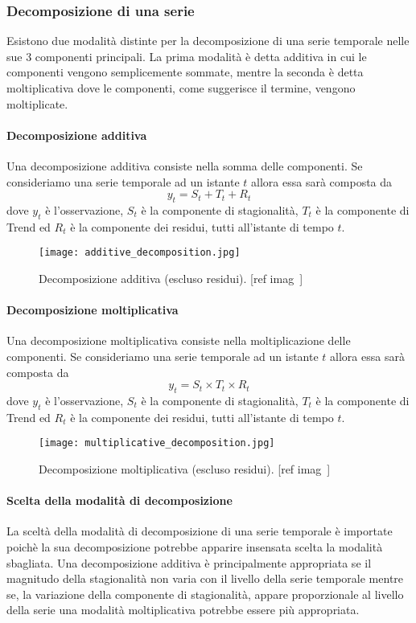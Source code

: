 \subsubsection{Decomposizione di una serie}
Esistono due modalità distinte per la decomposizione di
una serie temporale nelle sue 3 componenti principali. La prima modalità è detta
additiva in cui le componenti vengono semplicemente sommate, mentre la seconda
è detta moltiplicativa dove le componenti, come suggerisce il termine, 
vengono moltiplicate.

\paragraph{Decomposizione additiva} 
Una decomposizione additiva consiste nella
somma delle componenti. Se consideriamo una serie temporale ad un 
istante $t$ allora essa sarà composta da
\[ y_t = S_t + T_t + R_t \]
dove $y_t$ è l'osservazione, $S_t$ è la componente di stagionalità, 
$T_t$ è la componente di Trend ed $R_t$ è la componente dei residui, tutti
all'istante di tempo $t$.
\begin{figure}[H]
    \centering
    \texttt{[image: additive\_decomposition.jpg]}
    \caption{Decomposizione additiva (escluso residui). [ref imag~\cite{md:seas_dec_imags}]}
\end{figure}


\paragraph{Decomposizione moltiplicativa} 
Una decomposizione moltiplicativa consiste nella
moltiplicazione delle componenti. Se consideriamo una serie temporale ad un 
istante $t$ allora essa sarà composta da
\[ y_t = S_t \times T_t \times R_t \]
dove $y_t$ è l'osservazione, $S_t$ è la componente di stagionalità, 
$T_t$ è la componente di Trend ed $R_t$ è la componente dei residui, tutti
all'istante di tempo $t$.
\begin{figure}[H]
    \centering
    \texttt{[image: multiplicative\_decomposition.jpg]}
    \caption{Decomposizione moltiplicativa (escluso residui). [ref imag~\cite{md:seas_dec_imags}]}
\end{figure}

\paragraph{Scelta della modalità di decomposizione}
La sceltà della modalità di decomposizione di una serie temporale è importate poichè
la sua decomposizione potrebbe apparire insensata scelta la modalità sbagliata.
Una decomposizione additiva è principalmente appropriata se il magnitudo della 
stagionalità non varia con il livello della serie temporale mentre se, la variazione
della componente di stagionalità, appare proporzionale al livello della serie una modalità
moltiplicativa potrebbe essere più appropriata.


